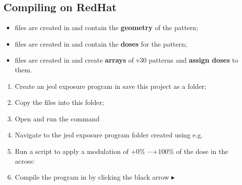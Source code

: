  \subsection{Compiling on RedHat}
 \begin{center}
   \begin{itemize}
   \item { files are created in  and contain the \textbf{geometry} of the
       pattern;}
   \item { files  are created in  and contain  the \textbf{doses} for the
       pattern;}
   \item {  files are created in   and create  \textbf{arrays} of v30
       patterns and \textbf{assign doses} to them.}
   \end{itemize}
 \end{center}
 \vspace{1cm}
 \begin{enumerate}
 \item Create an jeol exposure program in  \ra {} save this project as a folder;
 \item Copy the  files into this folder;
 \item Open  and run the command
   \begin{center}
   \end{center}
 \item Navigate to the jeol exposure program folder created using  e.g.
   \begin{center}
   \end{center}
 \item Run a script to apply a modulation of +0\% $ \cdots$+100\% of the dose in the  across: 
	
 \item  Compile   the  program  in      by  clicking  the   black  arrow
   $  \blacktriangleright  $\newline  {}
 \end{enumerate}
